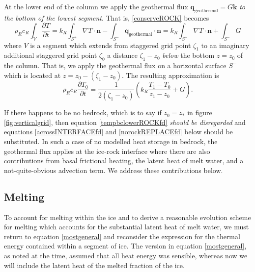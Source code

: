 \documentclass[12pt,final]{amsart}%
\theoremstyle{plain}
\theoremstyle{definition}
\theoremstyle{remark}
\newcommand{\ddt}[1]{\ensuremath{\frac{\partial #1}{\partial t}}}
\newcommand{\grad}{\nabla}
\newcommand{\khat}{\mathbf{k}}
\newcommand{\nhat}{\mathbf{n}}
\newcommand{\bq}{{\mathbf{q}}}
\begin{document}
At the lower end of the column we apply the geothermal flux $\bq_{\text{geothermal}} = G \khat$ \emph{to the bottom of the lowest segment}.  That is, \eqref{conserveROCK} becomes
\begin{equation*}
\rho_R c_R \int_V \ddt{T} = k_R \int_{S^+} \grad T \cdot \nhat - \int_{S^-} \bq_{\text{geothermal}} \cdot \nhat = k_R \int_{S^+} \grad T \cdot \nhat + \int_{S^-} G
\end{equation*}
where $V$ is a segment which extends from staggered grid point $\zeta_1$ to an imaginary additional staggered grid point $\zeta_{0}$ a distance $\zeta_1 - z_0$ \emph{below} the bottom $z=z_0$ of the column.  That is, we apply the geothermal flux on a horizontal surface $S^-$ which is located at $z=z_0 - (\zeta_1-z_0)$.  The resulting approximation is
\begin{equation}
\rho_R c_R \ddt{T_0} = \frac{1}{2(\zeta_1-z_0)} \left(k_R \frac{T_{1}-T_0}{z_{1}-z_0} +G\right). \label{tempbclowerROCKfd}
\end{equation}

If there happens to be no bedrock, which is to say if $z_0=z_\ast$ in figure \ref{fig:verticalgrid}, then equation \eqref{tempbclowerROCKfd} \emph{should be disregarded} and equations \eqref{acrossINTERFACEfd} and \eqref{norockREPLACEfd} below should be substituted.  In such a case of no modelled heat storage in bedrock, the geothermal flux applies at the ice-rock interface where there are also contributions from basal frictional heating, the latent heat of melt water, and a not-quite-obvious advection term.  We address these contributions below.

\subsection*{Melting}  To account for melting within the ice and to derive a reasonable evolution scheme for melting which accounts for the substantial latent heat of melt water, we must return to equation \eqref{mostgeneral} and reconsider the expression for the thermal energy contained within a segment of ice.  The version in equation \eqref{mostgeneral}, as noted at the time, assumed that all heat energy was sensible, whereas now we will include the latent heat of the melted fraction of the ice.
\end{document}
